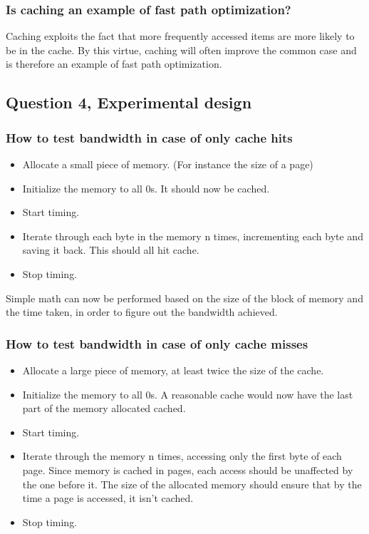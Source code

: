 \documentclass[11pt,a4paper]{article}
\begin{document}
\subsubsection{Is caching an example of fast path optimization?}

Caching exploits the fact that more frequently accessed items are more likely
to be in the cache. By this virtue, caching will often improve the common case
and is therefore an example of fast path optimization.

\subsection{Question 4, Experimental design}
\subsubsection{How to test bandwidth in case of only cache hits}
\begin{itemize}
    \item Allocate a small piece of memory. (For instance the size of a page)
    \item Initialize the memory to all 0s. It should now be cached.
    \item Start timing.
    \item Iterate through each byte in the memory n times, incrementing each byte
          and saving it back. This should all hit cache.
    \item Stop timing.
\end{itemize}

Simple math can now be performed based on the size of the block of memory and
the time taken, in order to figure out the bandwidth achieved.

\subsubsection{How to test bandwidth in case of only cache misses}
\begin{itemize}
    \item Allocate a large piece of memory, at least twice the size of the cache.
    \item Initialize the memory to all 0s. A reasonable cache would now have the last part of the memory allocated cached. 
    \item Start timing.
    \item Iterate through the memory n times, accessing only the first byte
          of each page. Since memory is cached in pages, each access should be
          unaffected by the one before it. The size of the allocated memory should
          ensure that by the time a page is accessed, it isn't cached.
    \item Stop timing.
\end{itemize}
\end{document}
